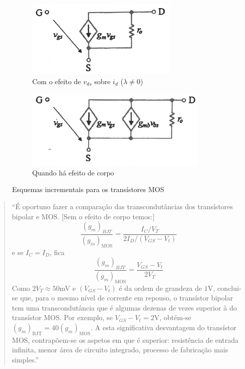\begin{figure}[H]
    \begin{subfigure}[b]{0.5\linewidth}
        \centering
        \includegraphics[width = 0.85\linewidth]{img/3/MOSFET/MOS-esquema-ro.png}
        \caption{Com o efeito de $v_{ds}$ sobre $i_d$ ($\lambda \neq 0$)}
        \label{fig:MOS-esquema-ro}
    \end{subfigure}
    \begin{subfigure}[b]{0.5\linewidth}
        \centering
        \includegraphics[width = \linewidth]{img/3/MOSFET/MOS-esquema-body.png}
        \caption{Quando há efeito de corpo}
        \label{fig:MOS-esquema-body-effect}
    \end{subfigure}%
    \caption{Esquemas incrementais para os transístores MOS \cite{medeiros:CTBM}}
    \label{fig:MOS-esquema-incremental}
\end{figure}

\begin{mdframed}
    \begin{quote} \small
        ``É oportuno fazer a comparação das transcondutâncias dos transístores bipolar e MOS. $[$Sem o efeito de corpo temos:$]$
        $$
            \frac{(g_m)_{BJT}}{(g_m)_\text{MOS}} = \frac{I_C/V_T}{2 I_D/(V_{GS} - V_t)}
        $$
        e se $I_C = I_D$, fica
        $$
            \frac{(g_m)_{BJT}}{(g_m)_\text{MOS}} = \frac{V_{GS} - V_t}{2 V_T}
        $$
        Como $2V_T \approx 50$mV e $(V_{GS} - V_t)$ é da ordem de grandeza de $1$V, conclui-se que, para o mesmo nível de corrente em repouso, o transístor bipolar tem uma transcondutância que é algumas dezenas de vezes superior à do transístor MOS. Por exemplo, se $V_{GS} - V_t = 2$V, obtém-se $(g_m)_\text{BJT} = 40(g_m)_\text{MOS}$. A esta significativa desvantagem do transístor MOS, contrapõem-se os aspetos em que é superior: resistência de entrada infinita, menor área de circuito integrado, processo de fabricação mais simples.''\cite{medeiros:CTBM}
    \end{quote}
\end{mdframed}
